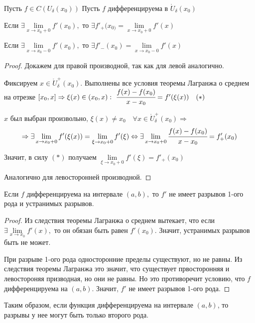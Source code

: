 \begin{theorem}
	Пусть $f \in C(U_{\delta}(x_{0})) $ Пусть $f$ дифференцируема в $\mathring{U}_{\delta}(x_{0})$
	
	Если $\exists \lim\limits_{x \to x_{0}+0} f'(x_{0}),$ то $\exists f'_{+}(x_{0)} = \lim\limits_{x\to x_{0}+0} f'(x)$
	
	Если $\exists \lim\limits_{x \to x_{0}-0} f'(x_{0}),$ то $\exists f'_{-}(x_{0}) = \lim\limits_{x\to x_{0}-0} f'(x)$
\end{theorem}
\begin{proof}
	Докажем для правой производной, так как для левой аналогично.
	
	Фиксируем $x\in \mathring{U}^{+}_{\delta}(x_{0})$. Выполнены все условия теоремы Лагранжа о среднем на отрезке $[x_{0}, x] \Rightarrow \xi(x) \in (x_{0}, x):\  \cfrac{f(x) - f(x_{0})}{x-x_{0}} = f'(\xi(x)) \quad (*)$
	
	$x$ был выбран произвольно, $\xi(x) \neq x_{0} \quad \forall x \in \mathring{U}^{+}_{\delta}(x_{0}) \Rightarrow $
	$$\Rightarrow \exists \lim\limits_{x \to x_{0}+0} f'(\xi(x)) =\lim\limits_{\xi \to x_{0}+0} f'(\xi) \Leftrightarrow \exists \lim\limits_{x \to x_{0}+0} \cfrac{f(x) - f(x_{0})}{x-x_{0}} = f'_{+}(x_{0})$$
	
	Значит, в силу $(*)$ получаем
	$
	\lim\limits_{\xi \to x_{0}+0} f'(\xi) = f'_{+}(x_{0})
	$
	
	Аналогично для левосторонней производной.
\end{proof}

\begin{corollary}
	Если $f$ дифференцируема на интервале $(a, b),$ то $f'$ не имеет разрывов 1-ого рода и устранимых разрывов.
\end{corollary}
\begin{proof}
	Из следствия теоремы Лагранжа о среднем вытекает, что если $\exists \lim\limits_{x\to x_{0}} f'(x),$ то он обязан быть равен $f'(x_{0})$. Значит, устранимых разрывов быть не может.
	
	При разрыве 1-ого рода односторонние пределы существуют, но не равны. Из следствия теоремы Лагранжа это значит, что существует првосторонняя и левостороняя призводная, но они не равны. Но это противоречит условию, что $f$ дифференцируема на $(a, b)$. Значит, $f'$ не имеет разрывов 1-ого рода. 
	
\end{proof}

Таким образом, если функция дифференцируема на интервале $(a,b)$, то разрывы у нее могут быть только второго рода. 

